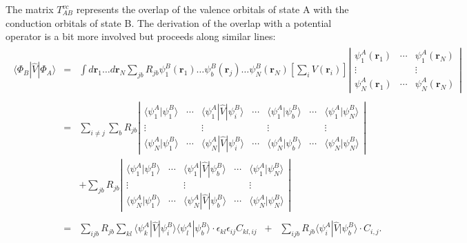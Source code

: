 \documentclass[letterpaper,10pt,english]{sphinxmanual}
\begin{document}
The matrix \(T_{AB}^{vc}\) represents the overlap of the valence
orbitals of state A with the conduction orbitals of state B. The
derivation of the overlap with a potential operator is a bit more
involved but proceeds along similar lines:
\begin{equation*}
\begin{split}\begin{aligned}
\langle\Phi_{B}|\hat{V}|\Phi_{A}\rangle & = & \int d\mathbf{r}_{1}\ldots d\mathbf{r}_{N}\sum_{jb}R_{jb}\psi_{1}^{B}(\mathbf{r}_{1})\ldots\psi_{b}^{B}(\mathbf{r}_{j})\ldots\psi_{N}^{B}(\mathbf{r}_{N})\left[\sum_{i}V(\mathbf{r}_{i})\right]\left|\begin{array}{ccc}
\psi_{1}^{A}(\mathbf{r}_{1}) & \cdots & \psi_{1}^{A}(\mathbf{r}_{N})\\
\vdots &  & \vdots\\
\psi_{N}^{A}(\mathbf{r}_{1}) & \cdots & \psi_{N}^{A}(\mathbf{r}_{N})
\end{array}\right|\nonumber \\
\nonumber \\
 & = & \sum_{i\ne j}\sum_{b}R_{jb}\left|\begin{array}{ccccccc}
\langle\psi_{1}^{A}|\psi_{1}^{B}\rangle & \cdots & \langle\psi_{1}^{A}|\hat{V}|\psi_{i}^{B}\rangle & \cdots & \langle\psi_{1}^{A}|\psi_{b}^{B}\rangle & \cdots & \langle\psi_{1}^{A}|\psi_{N}^{B}\rangle\\
\vdots &  & \vdots &  & \vdots &  & \vdots\\
\langle\psi_{N}^{A}|\psi_{1}^{B}\rangle & \cdots & \langle\psi_{N}^{A}|\hat{V}|\psi_{i}^{B}\rangle & \cdots & \langle\psi_{N}^{A}|\psi_{b}^{B}\rangle & \cdots & \langle\psi_{N}^{A}|\psi_{N}^{B}\rangle
\end{array}\right|\nonumber \\
 &  & +\sum_{jb}R_{jb}\left|\begin{array}{ccccc}
\langle\psi_{1}^{A}|\psi_{1}^{B}\rangle & \cdots & \langle\psi_{1}^{A}|\hat{V}|\psi_{b}^{B}\rangle & \cdots & \langle\psi_{1}^{A}|\psi_{N}^{B}\rangle\\
\vdots &  & \vdots &  & \vdots\\
\langle\psi_{N}^{A}|\psi_{1}^{B}\rangle & \cdots & \langle\psi_{N}^{A}|\hat{V}|\psi_{b}^{B}\rangle & \cdots & \langle\psi_{N}^{A}|\psi_{N}^{B}\rangle
\end{array}\right|\nonumber \\
\nonumber \\
 & = & \sum_{ijb}R_{jb}\sum_{kl}\langle\psi_{k}^{A}|\hat{V}|\psi_{i}^{B}\rangle\langle\psi_{l}^{A}|\psi_{b}^{B}\rangle\cdot\epsilon_{kl}\epsilon_{ij}C_{kl,ij}\;\;+\;\;\sum_{ijb}R_{jb}\langle\psi_{i}^{A}|\hat{V}|\psi_{b}^{B}\rangle\cdot C_{i,j}.\end{aligned}\end{split}
\end{equation*}
\end{document}
